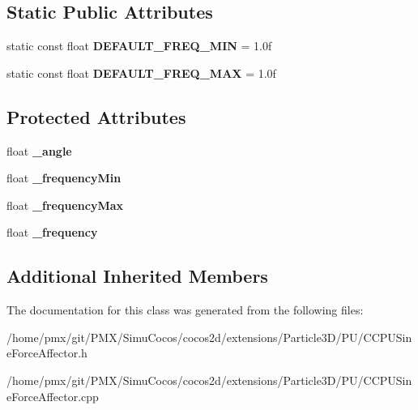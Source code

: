 \subsection*{Static Public Attributes}
\begin{DoxyCompactItemize}
\item 
\mbox{\label{classPUSineForceAffector_abee7bd25301c2672f8f1a663d27a6b0b}} 
static const float {\bfseries D\+E\+F\+A\+U\+L\+T\+\_\+\+F\+R\+E\+Q\+\_\+\+M\+IN} = 1.\+0f
\item 
\mbox{\label{classPUSineForceAffector_a544e6f9e32f956700dc0b08a4d431170}} 
static const float {\bfseries D\+E\+F\+A\+U\+L\+T\+\_\+\+F\+R\+E\+Q\+\_\+\+M\+AX} = 1.\+0f
\end{DoxyCompactItemize}
\subsection*{Protected Attributes}
\begin{DoxyCompactItemize}
\item 
\mbox{\label{classPUSineForceAffector_a4532810ec56804c01756ab0ae40ae767}} 
float {\bfseries \+\_\+angle}
\item 
\mbox{\label{classPUSineForceAffector_a0af3b4d2f0237f9fab29affed2e2f75b}} 
float {\bfseries \+\_\+frequency\+Min}
\item 
\mbox{\label{classPUSineForceAffector_a9cd45b2a507719ede47e1aeffd39c220}} 
float {\bfseries \+\_\+frequency\+Max}
\item 
\mbox{\label{classPUSineForceAffector_a0ce2b2df3e63b4723e2f418f222414f7}} 
float {\bfseries \+\_\+frequency}
\end{DoxyCompactItemize}
\subsection*{Additional Inherited Members}


The documentation for this class was generated from the following files\+:\begin{DoxyCompactItemize}
\item 
/home/pmx/git/\+P\+M\+X/\+Simu\+Cocos/cocos2d/extensions/\+Particle3\+D/\+P\+U/C\+C\+P\+U\+Sine\+Force\+Affector.\+h\item 
/home/pmx/git/\+P\+M\+X/\+Simu\+Cocos/cocos2d/extensions/\+Particle3\+D/\+P\+U/C\+C\+P\+U\+Sine\+Force\+Affector.\+cpp\end{DoxyCompactItemize}
